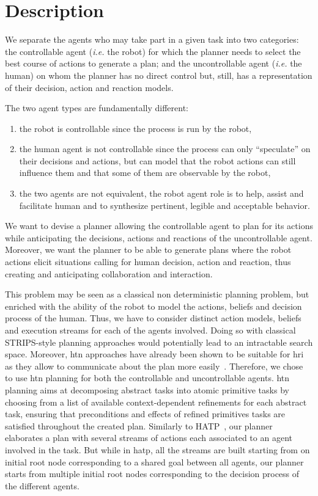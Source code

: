 \documentclass[a4paper,11pt,twoside]{StyleThese}
\begin{document}
\section{Description}
We separate the agents who may take part in a given task into two categories: the controllable agent (\textit{i.e.} the robot) for which the planner needs to select the best course of actions to generate a plan; and the uncontrollable agent (\textit{i.e.} the human) on whom the planner has no direct control but, still, has a representation of their decision, action and reaction models.

The two agent types are fundamentally different: 
\begin{enumerate}
\item the robot is controllable since the process is run by the robot,
\item the human agent is not controllable since the process can only ``speculate'' on their decisions and actions, but can model that the robot actions can still influence them and that some of them are observable by the robot,
\item the two agents are not equivalent, the robot agent role is to help, assist and facilitate human and to synthesize pertinent, legible and acceptable behavior.
\end{enumerate}
We want to devise a planner allowing the controllable agent to plan for its actions while anticipating the decisions, actions and reactions of the uncontrollable agent. Moreover, we want the planner to be able to generate plans where the robot actions elicit situations calling for human decision, action and reaction, thus creating and anticipating collaboration and interaction.

\smallskip

This problem may be seen as a classical non deterministic planning problem, but enriched with the ability of the robot to model the actions, beliefs and decision process of the human. Thus, we have to consider distinct action models, beliefs and execution streams for each of the agents involved. Doing so with classical STRIPS-style planning approaches would potentially lead to an intractable search space. Moreover, \acrshort{htn} approaches have already been shown to be suitable for \acrshort{hri} as they allow to communicate about the plan more easily~\cite{lallement2014hatp}. Therefore, we chose to use \acrshort{htn} planning for both the controllable and uncontrollable agents. \acrshort{htn} planning aims at decomposing abstract tasks into atomic primitive tasks by choosing from a list of available context-dependent refinements for each abstract task, ensuring that preconditions and effects of refined primitives tasks are satisfied throughout the created plan. Similarly to HATP~\cite{sebastiani2017dealing}, our planner elaborates a plan with several streams of actions each associated to an agent involved in the task. But while in \acrshort{hatp}, all the streams are built starting from on initial root node corresponding to a shared goal between all agents, our planner starts from multiple initial root nodes corresponding to the decision process of the different agents.
\end{document}
